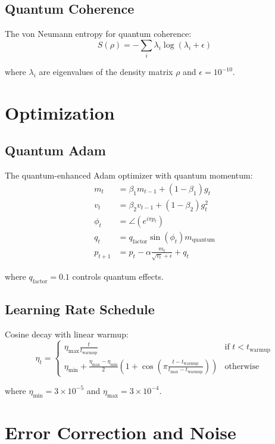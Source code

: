 \documentclass{article}
\begin{document}
\subsection{Quantum Coherence}
The von Neumann entropy for quantum coherence:
\begin{equation}
S(\rho) = -\sum_i \lambda_i \log(\lambda_i + \epsilon)
\end{equation}

where $\lambda_i$ are eigenvalues of the density matrix $\rho$ and $\epsilon=10^{-10}$.

\section{Optimization}

\subsection{Quantum Adam}
The quantum-enhanced Adam optimizer with quantum momentum:
\begin{align*}
m_t &= \beta_1 m_{t-1} + (1-\beta_1)g_t \\
v_t &= \beta_2 v_{t-1} + (1-\beta_2)g_t^2 \\
\phi_t &= \angle(e^{i\pi p_t}) \\
q_t &= q_{\text{factor}} \sin(\phi_t) m_{\text{quantum}} \\
p_{t+1} &= p_t - \alpha\frac{m_t}{\sqrt{v_t} + \epsilon} + q_t
\end{align*}

where $q_{\text{factor}}=0.1$ controls quantum effects.

\subsection{Learning Rate Schedule}
Cosine decay with linear warmup:
\begin{equation}
\eta_t = \begin{cases}
\eta_{\text{max}}\frac{t}{t_{\text{warmup}}} & \text{if } t < t_{\text{warmup}} \\
\eta_{\text{min}} + \frac{\eta_{\text{max}}-\eta_{\text{min}}}{2}(1 + \cos(\pi\frac{t-t_{\text{warmup}}}{t_{\text{max}}-t_{\text{warmup}}})) & \text{otherwise}
\end{cases}
\end{equation}

where $\eta_{\text{min}}=3\times10^{-5}$ and $\eta_{\text{max}}=3\times10^{-4}$.

\section{Error Correction and Noise}
\end{document}

